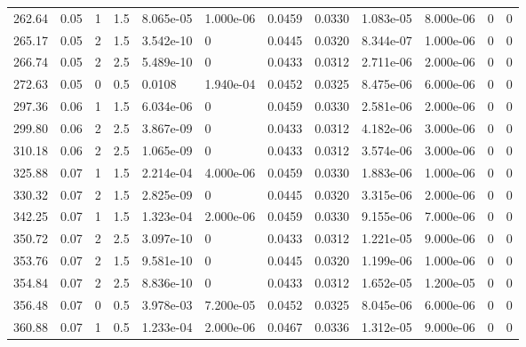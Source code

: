 \documentclass[preview]{standalone}
\begin{document}
{{\begin{tabular}{L{1.2cm}C{1.2cm} C{0.3cm}C{0.5cm} C{1.4cm}C{1.4cm} C{1.4cm}C{1.4cm} C{1.6cm}C{1.6cm} C{1.6cm}C{1.6cm}}
  262.64  &  0.05  & 1     & 1.5 &  8.065e-05  & 1.000e-06  &  0.0459&   0.0330& 1.083e-05 & 8.000e-06   &  0 & 0  \\ 
  265.17  &  0.05  & 2     & 1.5 &  3.542e-10  & 0  &  0.0445&   0.0320& 8.344e-07 & 1.000e-06   &  0 & 0  \\ 
  266.74  &  0.05  & 2     & 2.5 &  5.489e-10  & 0  &  0.0433&   0.0312& 2.711e-06 & 2.000e-06   &  0 & 0  \\ 
  272.63  &  0.05  & 0     & 0.5 &  0.0108  & 1.940e-04  &  0.0452&   0.0325& 8.475e-06 & 6.000e-06   &  0 & 0  \\ 
  297.36  &  0.06  & 1     & 1.5 &  6.034e-06  & 0  &  0.0459&   0.0330& 2.581e-06 & 2.000e-06   &  0 & 0  \\ 
  299.80  &  0.06  & 2     & 2.5 &  3.867e-09  & 0  &  0.0433&   0.0312& 4.182e-06 & 3.000e-06   &  0 & 0  \\ 
  310.18  &  0.06  & 2     & 2.5 &  1.065e-09  & 0  &  0.0433&   0.0312& 3.574e-06 & 3.000e-06   &  0 & 0  \\ 
  325.88  &  0.07  & 1     & 1.5 &  2.214e-04  & 4.000e-06  &  0.0459&   0.0330& 1.883e-06 & 1.000e-06   &  0 & 0  \\ 
  330.32  &  0.07  & 2     & 1.5 &  2.825e-09  & 0  &  0.0445&   0.0320& 3.315e-06 & 2.000e-06   &  0 & 0  \\ 
  342.25  &  0.07  & 1     & 1.5 &  1.323e-04  & 2.000e-06  &  0.0459&   0.0330& 9.155e-06 & 7.000e-06   &  0 & 0  \\ 
  350.72  &  0.07  & 2     & 2.5 &  3.097e-10  & 0  &  0.0433&   0.0312& 1.221e-05 & 9.000e-06   &  0 & 0  \\ 
  353.76  &  0.07  & 2     & 1.5 &  9.581e-10  & 0  &  0.0445&   0.0320& 1.199e-06 & 1.000e-06   &  0 & 0  \\ 
  354.84  &  0.07  & 2     & 2.5 &  8.836e-10  & 0  &  0.0433&   0.0312& 1.652e-05 & 1.200e-05   &  0 & 0  \\ 
  356.48  &  0.07  & 0     & 0.5 &  3.978e-03  & 7.200e-05  &  0.0452&   0.0325& 8.045e-06 & 6.000e-06   &  0 & 0  \\ 
  360.88  &  0.07  & 1     & 0.5 &  1.233e-04  & 2.000e-06  &  0.0467&   0.0336& 1.312e-05 & 9.000e-06   &  0 & 0  \\ 
\hline 
\end{tabular} 

}}
\end{document}
